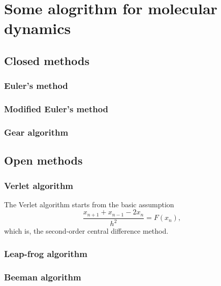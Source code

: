 
\section{Some alogrithm for molecular dynamics}

\subsection{Closed methods}

\subsubsection{Euler's method}

\subsubsection{Modified Euler's method}

\subsubsection{Gear algorithm}


\subsection{Open methods}

\subsubsection{Verlet algorithm}

The Verlet algorithm starts from the basic assumption
\begin{equation}\label{eq:verlet}
	\frac{ x_{n+1} + x_{n-1} - 2 x_n }{ h^2 } = F(x_n),
\end{equation}
which is, the second-order central difference method.

\subsubsection{Leap-frog algorithm}

\subsubsection{Beeman algorithm}

